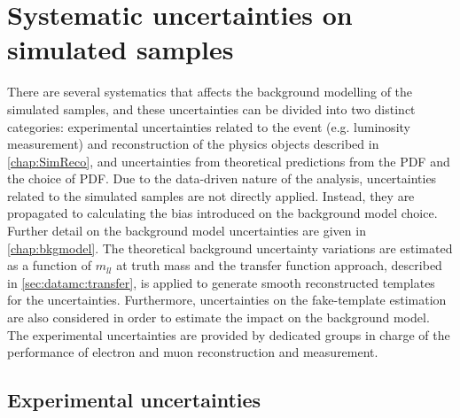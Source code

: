 \chapter{Systematic uncertainties on simulated samples}\label{chap:sysmc}

There are several systematics that affects the background modelling of the simulated samples, and these uncertainties can be divided into two distinct categories: experimental uncertainties related to the event (e.g. luminosity measurement) and reconstruction of the physics objects described in \cref{chap:SimReco}, and uncertainties from theoretical predictions from the PDF and the choice of PDF. Due to the data-driven nature of the analysis, uncertainties related to the simulated samples are not directly applied. Instead, they are propagated to calculating the bias introduced on the background model choice. Further detail on the background model uncertainties are given in \cref{chap:bkgmodel}. The theoretical background uncertainty variations are estimated as a function of $m_{ll}$ at truth mass and the transfer function approach, described in \cref{sec:datamc:transfer}, is applied to generate smooth reconstructed templates for the uncertainties. Furthermore, uncertainties on the fake-template estimation are also considered in order to estimate the impact on the background model. The experimental uncertainties are provided by dedicated groups in charge of the performance of electron and muon reconstruction and measurement.

\section{Experimental uncertainties}\label{sec:sysmc:exp}

